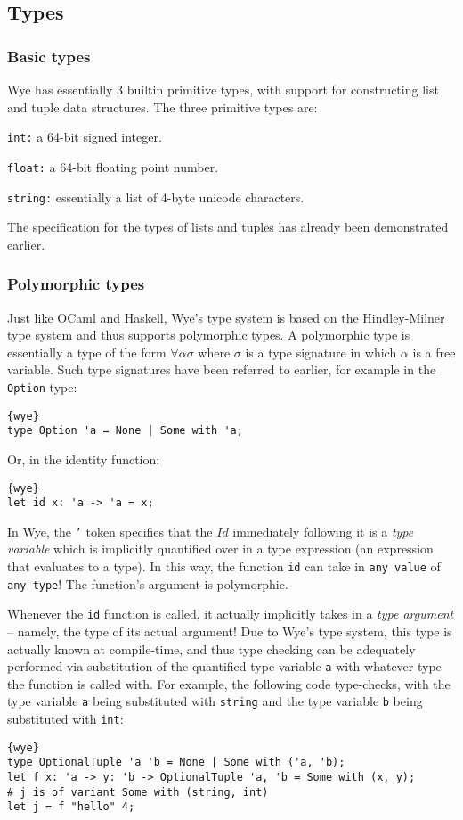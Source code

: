 \documentclass[a4paper, 12pt]{article}
\theoremstyle{myplain}
\theoremstyle{mydefinition}
\theoremstyle{myremark}
\numberwithin{equation} {section}
\numberwithin{figure}   {section}
\numberwithin{table}    {section}
\begin{document}
\subsection{Types}

\subsubsection{Basic types}

Wye has essentially 3 builtin primitive types, with support for constructing list and tuple data structures. The three primitive types are:

\texttt{int:} a 64-bit signed integer.

\texttt{float:} a 64-bit floating point number.

\texttt{string:} essentially a list of 4-byte unicode characters.

The specification for the types of lists and tuples has already been demonstrated earlier.

\subsubsection{Polymorphic types}

Just like OCaml and Haskell, Wye's type system is based on the Hindley-Milner type system and thus supports polymorphic types. A polymorphic type is essentially a type of the form $\forall \alpha \sigma$ where $\sigma$ is a type signature in which $\alpha$ is a free variable. Such type signatures have been referred to earlier, for example in the \texttt{Option} type:
\begin{lstlisting}{wye}
type Option 'a = None | Some with 'a;
\end{lstlisting}
Or, in the identity function:
\begin{lstlisting}{wye}
let id x: 'a -> 'a = x;
\end{lstlisting}
In Wye, the \texttt{'} token specifies that the $Id$ immediately following it is a \textit{type variable} which is implicitly quantified over in a type expression (an expression that evaluates to a type). In this way, the function \texttt{id} can take in \texttt{any value} of \texttt{any type}! The function's argument is polymorphic.

Whenever the \texttt{id} function is called, it actually implicitly takes in a \textit{type argument} -- namely, the type of its actual argument! Due to Wye's type system, this type is actually known at compile-time, and thus type checking can be adequately performed via substitution of the quantified type variable \texttt{a} with whatever type the function is called with. For example, the following code type-checks, with the type variable \texttt{a} being substituted with \texttt{string} and the type variable \texttt{b} being substituted with \texttt{int}:
\begin{lstlisting}{wye}
type OptionalTuple 'a 'b = None | Some with ('a, 'b);
let f x: 'a -> y: 'b -> OptionalTuple 'a, 'b = Some with (x, y);
# j is of variant Some with (string, int)
let j = f "hello" 4;
\end{lstlisting}
\end{document}
